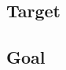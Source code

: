 \propScenariosExist*

\propAbilityExuastive*

\propNoESUandADB*

\propNI*


\subsection*{Target}

\targetESU*

\targeGESU*

\subsection*{Goal}

\goalEAS*

\ideaEASw*




